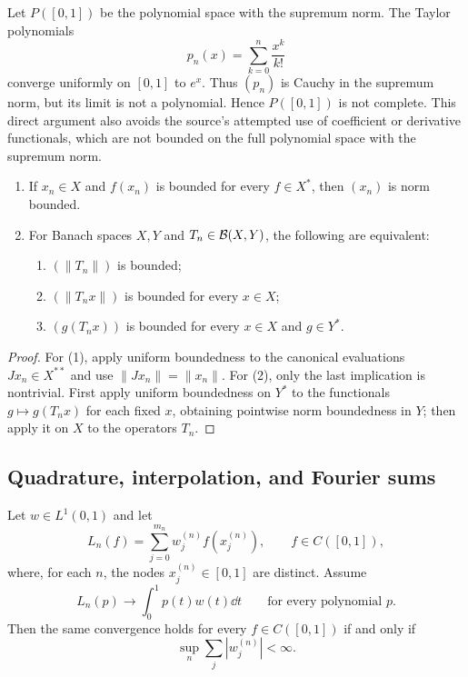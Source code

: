 \begin{noteexample}
Let $P([0,1])$ be the polynomial space with the supremum norm.  The Taylor
polynomials
\[
  p_n(x)=\sum_{k=0}^{n}\frac{x^k}{k!}
\]
converge uniformly on $[0,1]$ to $e^x$.  Thus $(p_n)$ is Cauchy in the
supremum norm, but its limit is not a polynomial.  Hence $P([0,1])$ is not
complete.  This direct argument also avoids the source's attempted use of
coefficient or derivative functionals, which are not bounded on the full
polynomial space with the supremum norm.
\end{noteexample}

\begin{noteexercise}
\begin{enumerate}
  \item If $x_n\in X$ and $f(x_n)$ is bounded for every $f\in X^*$, then
        $(x_n)$ is norm bounded.
  \item For Banach spaces $X,Y$ and $T_n\in\mathcal{B}(X,Y)$, the following are
        equivalent:
        \begin{enumerate}
          \item $(\|T_n\|)$ is bounded;
          \item $(\|T_nx\|)$ is bounded for every $x\in X$;
          \item $(g(T_nx))$ is bounded for every $x\in X$ and $g\in Y^*$.
        \end{enumerate}
\end{enumerate}
\end{noteexercise}

\begin{proof}
For (1), apply uniform boundedness to the canonical evaluations
$Jx_n\in X^{**}$ and use $\|Jx_n\|=\|x_n\|$.  For (2), only the last
implication is nontrivial.  First apply uniform boundedness on $Y^*$ to the
functionals $g\mapsto g(T_nx)$ for each fixed $x$, obtaining pointwise norm
boundedness in $Y$; then apply it on $X$ to the operators $T_n$.
\end{proof}

\subsection{Quadrature, interpolation, and Fourier sums}

\begin{notetheorem}
Let $w\in L^1(0,1)$ and let
\[
  L_n(f)=\sum_{j=0}^{m_n}w_j^{(n)}f(x_j^{(n)}),
  \qquad f\in C([0,1]),
\]
where, for each $n$, the nodes $x_j^{(n)}\in[0,1]$ are distinct.  Assume
\[
  L_n(p)\longrightarrow\int_0^1p(t)w(t)\dd t
  \qquad\text{for every polynomial }p.
\]
Then the same convergence holds for every $f\in C([0,1])$ if and only if
\[
  \sup_n\sum_j|w_j^{(n)}|<\infty.
\]
\end{notetheorem}

